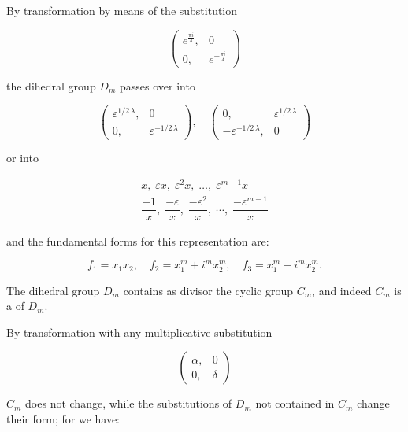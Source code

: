By transformation by means of the substitution

\[
\begin{pmatrix} e^{\frac{\pi i}{4}}, & 0 \\ 0, & e^{-\frac{\pi i}{4}} \end{pmatrix}
\]

the dihedral group $D_m$ passes over into

\[
\begin{pmatrix} \varepsilon^{1/2\,\lambda}, & 0 \\ 0, & \varepsilon^{-1/2\,\lambda} \end{pmatrix}, \quad
\begin{pmatrix} 0, & \varepsilon^{1/2\,\lambda} \\ -\varepsilon^{-1/2\,\lambda}, & 0 \end{pmatrix}
\]

or into

\[
\begin{gathered}
x, \; \varepsilon x, \; \varepsilon^2 x, \; \ldots, \; \varepsilon^{m-1} x\\[4pt]
\dfrac{-1}{x}, \; \dfrac{-\varepsilon}{x}, \; \dfrac{-\varepsilon^2}{x}, \; \cdots, \; \dfrac{-\varepsilon^{m-1}}{x}
\end{gathered}
\]

and the fundamental forms for this representation are:

\[
f_1 = x_1 x_2, \quad f_2 = x_1^m + i^m x_2^m, \quad f_3 = x_1^m - i^m x_2^m.
\]

The dihedral group $D_m$ contains as divisor the cyclic
group $C_m$, and indeed $C_m$ is a  of $D_m$.

By transformation with any multiplicative
substitution

\[
\begin{pmatrix} \alpha, & 0 \\ 0, & \delta \end{pmatrix}
\]

$C_m$ does not change, while the substitutions of $D_m$ not contained
in $C_m$ change their form; for we have:

